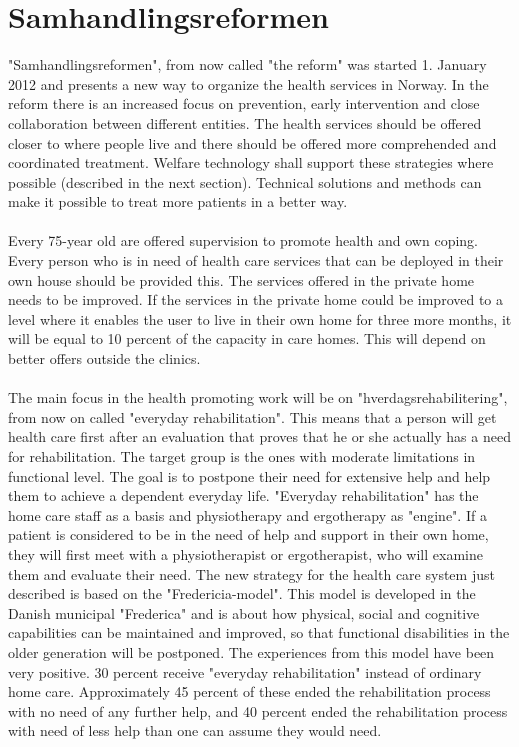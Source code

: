 \section{Samhandlingsreformen}
"Samhandlingsreformen", from now called "the reform" was started 1. January 2012 and presents a new way to organize the health services in Norway. In the reform there is an increased focus on prevention, early intervention and close collaboration between different entities. The health services should be offered closer to where people live and there should be offered more comprehended and coordinated treatment. Welfare technology shall support these strategies where possible (described in the next section). Technical solutions and methods can make it possible to treat more patients in a better way. \\ \\
Every 75-year old are offered supervision to promote health and own coping. Every person who is in need of health care services that can be deployed in their own house should be provided this. The services offered in the private home needs to be improved. If the services in the private home could be improved to a level where it enables the user to live in their own home for three more months, it will be equal to 10 percent of the capacity in care homes. This will depend on better offers outside the clinics.\\ \\ The main focus in the health promoting work will be on "hverdagsrehabilitering", from now on called  "everyday rehabilitation". This means that a person will get health care first after an evaluation that proves that he or she actually has a need for rehabilitation. The target group is the ones with moderate limitations in functional level. The goal is to postpone their need for extensive help and help them to achieve a dependent everyday life.  "Everyday rehabilitation" has the home care staff as a basis and physiotherapy and ergotherapy as "engine". If a patient is considered to be in the need of help and support in their own home, they will first meet with a physiotherapist or ergotherapist, who will examine them and evaluate their need. The new strategy for the health care system just described is based on the "Fredericia-model". This model is developed in the Danish municipal "Frederica" and is about how physical, social and cognitive capabilities can be maintained and improved, so that functional disabilities in the older generation will be postponed. The experiences from this model have been very positive. 30 percent receive "everyday rehabilitation" instead of ordinary home care. Approximately 45 percent of these ended the rehabilitation process with no need of any further help, and 40 percent ended the rehabilitation process with need of less help than one can assume they would need.\cite{budsjett}\cite{regjering}
